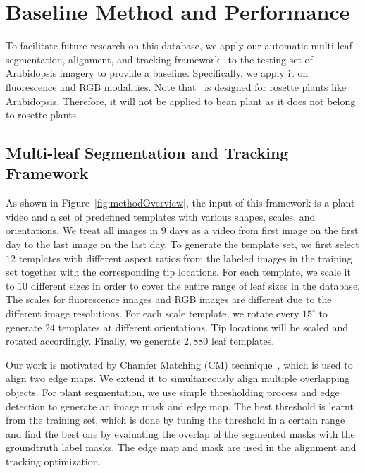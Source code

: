 \section{Baseline Method and Performance}
\label{sec:baseline}

To facilitate future research on this database, we apply our automatic multi-leaf segmentation, alignment, and tracking framework~\cite{yin2014a,yin2014b} to the testing set of Arabidopsis imagery to provide a baseline.
Specifically, we apply it on fluorescence and RGB modalities. 
Note that~\cite{yin2014a,yin2014b} is designed for rosette plants like Arabidopsis.
Therefore, it will not be applied to bean plant as it does not belong to rosette plants.

\subsection{Multi-leaf Segmentation and Tracking Framework}
As shown in Figure~\ref{fig:methodOverview}, the input of this framework is a plant video and a set of predefined templates with various shapes, scales, and orientations.
We treat all images in $9$ days as a video from first image on the first day to the last image on the last day.
To generate the template set, we first select $12$ templates with different aspect ratios from the labeled images in the training set together with the corresponding tip locations.
For each template, we scale it to $10$ different sizes in order to cover the entire range of leaf sizes in the database.
The scales for fluorescence images and RGB images are different due to the different image resolutions. 
For each scale template, we rotate every $15^{\circ}$ to generate $24$ templates at different orientations.
Tip locations will be scaled and rotated accordingly.
Finally, we generate $2,880$ leaf templates.

Our work is motivated by Chamfer Matching (CM) technique~\cite{barrow1977parametric}, which is used to align two edge maps.
We extend it to simultaneously align multiple overlapping objects.
For plant segmentation, we use simple thresholding process and edge detection to generate an image mask and edge map.
The best threshold is learnt from the training set, which is done by tuning the threshold in a certain range and find the best one by evaluating the overlap of the segmented masks with the groundtruth label masks.
The edge map and mask are used in the alignment and tracking optimization.

